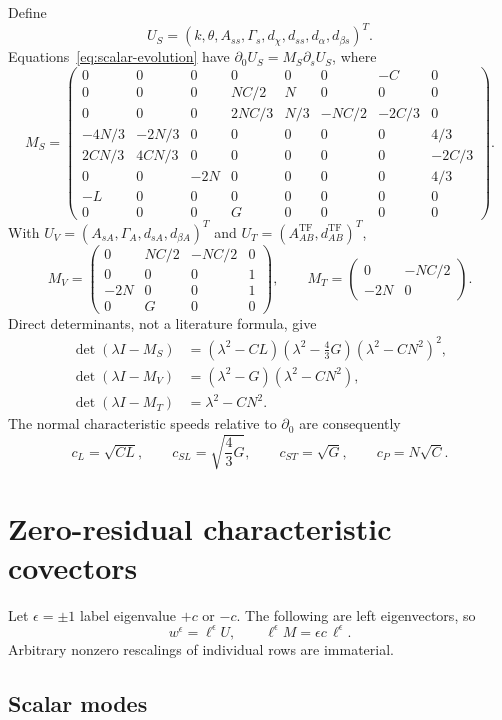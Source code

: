 \documentclass[11pt]{article}
\newcommand{\dtzero}{\partial_0}
\newcommand{\tf}{\mathrm{TF}}
\begin{document}
Define
\[
 U_S=(k,\theta,A_{ss},\Gamma_s,d_\chi,d_{ss},
      d_\alpha,d_{\beta s})^T.
\]
Equations~\eqref{eq:scalar-evolution} have
\(\dtzero U_S=M_S\partial_s U_S\), where
{\small
\[
M_S=
\begin{pmatrix}
0&0&0&0&0&0&-C&0\\
0&0&0&NC/2&N&0&0&0\\
0&0&0&2NC/3&N/3&-NC/2&-2C/3&0\\
-4N/3&-2N/3&0&0&0&0&0&4/3\\
2CN/3&4CN/3&0&0&0&0&0&-2C/3\\
0&0&-2N&0&0&0&0&4/3\\
-L&0&0&0&0&0&0&0\\
0&0&0&G&0&0&0&0
\end{pmatrix}.
\]
}
With \(U_V=(A_{sA},\Gamma_A,d_{sA},d_{\beta A})^T\) and
\(U_T=(A_{AB}^{\tf},d_{AB}^{\tf})^T\),
\[
M_V=
\begin{pmatrix}
0&NC/2&-NC/2&0\\
0&0&0&1\\
-2N&0&0&1\\
0&G&0&0
\end{pmatrix},
\qquad
M_T=
\begin{pmatrix}
0&-NC/2\\
-2N&0
\end{pmatrix}.
\]
Direct determinants, not a literature formula, give
\begin{align}
 \det(\lambda I-M_S)
  &=(\lambda^2-CL)(\lambda^2-\tfrac43G)
    (\lambda^2-CN^2)^2,\\
 \det(\lambda I-M_V)
  &=(\lambda^2-G)(\lambda^2-CN^2),\\
 \det(\lambda I-M_T)
  &=\lambda^2-CN^2.
\end{align}
The normal characteristic speeds relative to \(\dtzero\) are consequently
\[
 c_L=\sqrt{CL},\qquad
 c_{SL}=\sqrt{\frac43G},\qquad
 c_{ST}=\sqrt G,\qquad
 c_P=N\sqrt C.
\]

\section{Zero-residual characteristic covectors}

Let \(\epsilon=\pm1\) label eigenvalue \(+\!c\) or \(-\!c\).
The following are left eigenvectors, so
\[
 w^\epsilon=\ell^\epsilon U,\qquad
 \ell^\epsilon M=\epsilon c\,\ell^\epsilon.
\]
Arbitrary nonzero rescalings of individual rows are immaterial.

\subsection{Scalar modes}
\end{document}
